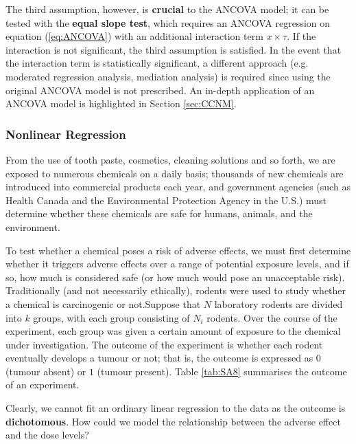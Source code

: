 \par The third assumption, however, is \textbf{crucial} to the ANCOVA model; it can be tested with the \textbf{equal slope test}, which requires an ANCOVA regression on equation (\ref{eq:ANCOVA}) with an additional interaction term $x \times \tau$. If the interaction is not significant, the third assumption is satisfied. In the event that the interaction term is statistically significant, a different approach (e.g. moderated regression analysis, mediation analysis) is required since using the original ANCOVA model is not prescribed. An in-depth application of an ANCOVA model is highlighted in Section \ref{sec:CCNM}.


\subsubsection{Nonlinear Regression}
From the use of tooth paste, cosmetics, cleaning solutions and so forth, we are exposed to numerous chemicals on a daily basis; thousands of new chemicals are introduced into commercial products each year, and government agencies (such as Health Canada and the Environmental Protection Agency in the U.S.) must determine whether these chemicals are safe for humans, animals, and the environment. \par To test whether a chemical poses a risk of adverse effects, we must first determine whether it triggers adverse effects over a range of potential exposure levels, and if so, how much is considered safe (or how much would pose an unacceptable risk). Traditionally (and not necessarily ethically), rodents were used to study whether a chemical is carcinogenic or not.\newl  Suppose that $N$ laboratory rodents are divided into $k$ groups, with each group consisting of $N_{i}$ rodents. Over the course of the experiment, each group was given a certain amount of exposure to the chemical under investigation. The outcome of the experiment is whether each rodent eventually develops a tumour or not; that is, the outcome is expressed as $0$ (tumour absent) or $1$ (tumour present). Table \ref{tab:SA8} summarises the outcome of an experiment. \par Clearly, we cannot fit an ordinary linear regression to the data as the outcome is \textbf{dichotomous}. How could we model the relationship between the adverse effect and the dose levels?

